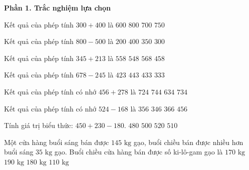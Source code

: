\textbf{Phần 1. Trắc nghiệm lựa chọn}

\begin{ex} %
Kết quả của phép tính $300 + 400$ là
\choice
{$600$}
{$800$}
{\True $700$}
{$750$}
\end{ex}

\begin{ex} %
Kết quả của phép tính $800 - 500$ là
\choice
{$200$}
{$400$}
{$350$}
{\True $300$}
\end{ex}

\begin{ex} %
Kết quả của phép tính $345 + 213$ là
\choice
{\True $558$}
{$548$}
{$568$}
{$458$}
\end{ex}

\begin{ex} %
Kết quả của phép tính $678 - 245$ là
\choice
{$423$}
{$443$}
{\True $433$}
{$333$}
\end{ex}

\begin{ex} %
Kết quả của phép tính có nhớ $456 + 278$ là
\choice
{$724$}
{$744$}
{$634$}
{\True $734$}
\end{ex}

\begin{ex} %
Kết quả của phép tính có nhớ $524 - 168$ là
\choice
{\True $356$}
{$346$}
{$366$}
{$456$}
\end{ex}

\begin{ex} %
Tính giá trị biểu thức: $450 + 230 - 180$.
\choice
{$480$}
{\True $500$}
{$520$}
{$510$}
\end{ex}

\begin{ex} %
Một cửa hàng buổi sáng bán được $145\text{ kg}$ gạo, buổi chiều bán được nhiều hơn buổi sáng $35\text{ kg}$ gạo. Buổi chiều cửa hàng bán được số ki-lô-gam gạo là
\choice
{$170\text{ kg}$}
{$190\text{ kg}$}
{\True $180\text{ kg}$}
{$110\text{ kg}$}
\end{ex}

